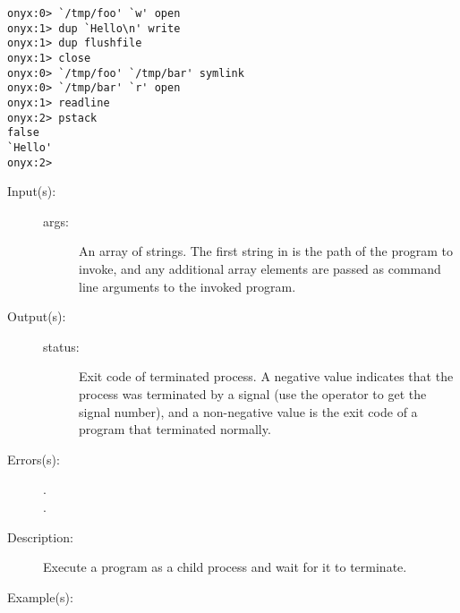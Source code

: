 \begin{description}
\begin{description}
\begin{verbatim}
onyx:0> `/tmp/foo' `w' open
onyx:1> dup `Hello\n' write
onyx:1> dup flushfile
onyx:1> close
onyx:0> `/tmp/foo' `/tmp/bar' symlink
onyx:0> `/tmp/bar' `r' open
onyx:1> readline
onyx:2> pstack
false
`Hello'
onyx:2>
		\end{verbatim}
	\end{description}
\label{systemdict:system}
\item[{\onyxop{args}{system}{status}}: ]
	\begin{description}\item[]
	\item[Input(s): ]
		\begin{description}\item[]
		\item[args: ]
			An array of strings.  The first string in 
			is the path of the program to invoke, and any additional
			array elements are passed as command line arguments to
			the invoked program.
		\end{description}
	\item[Output(s): ]
		\begin{description}\item[]
		\item[status: ]
			Exit code of terminated process.  A negative value
			indicates that the process was terminated by a signal
			(use the 
			operator to get the signal number), and a non-negative
			value is the exit code of a program that terminated
			normally.
		\end{description}
	\item[Errors(s): ]
		\begin{description}\item[]
		\item[.]
		\item[.]
		\end{description}
	\item[Description: ]
		Execute a program as a child process and wait for it to
		terminate.
	\item[Example(s): ]\begin{verbatim}


\end{verbatim}
\end{description}
\end{description}
